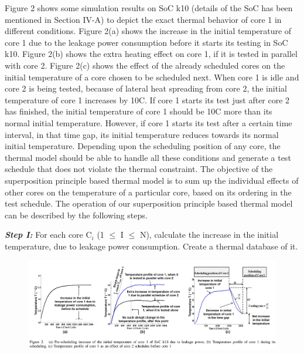 \documentclass[conference]{IEEEtran}
\begin{document}
 
	\par 
	Figure 2 shows some simulation results on SoC k10
(details of the SoC has been mentioned in Section IV-A)
to depict the exact thermal behavior of core 1 in different
conditions. Figure 2(a) shows the increase in the initial
temperature of core 1 due to the leakage power consumption
before it starts its testing in SoC k10. Figure 2(b) shows the
extra heating effect on core 1, if it is tested in parallel with core
2. Figure 2(c) shows the effect of the already scheduled cores
on the initial temperature of a core chosen to be scheduled
next. When core 1 is idle and core 2 is being tested, because
of lateral heat spreading from core 2, the initial temperature
of core 1 increases by 10\degree C. If core 1 starts its test just after
core 2 has finished, the initial temperature of core 1 should
be 10\degree C more than its normal initial temperature. However, if
core 1 starts its test after a certain time interval, in that time
gap, its initial temperature reduces towards its normal initial
temperature. Depending upon the scheduling position of any
core, the thermal model should be able to handle all these
conditions and generate a test schedule that does not violate the
thermal constraint. The objective of the superposition principle
based thermal model is to sum up the individual effects of
other cores on the temperature of a particular core, based
on its ordering in the test schedule. The operation of our
superposition principle based thermal model can be described
by the following steps.\\


	\par
	\textbf{\textit{Step I:}} For each core C$_{i}$ (1 $\leq$ I $\leq$ N), calculate the
increase in the initial temperature, due to leakage power
consumption. Create a thermal database of it.\\


\vspace{8 mm}\begin{figure}[ht]
    \centering
   \includegraphics[width=160 mm,scale=0.5]{3.png}
\end{figure}
\end{document}

